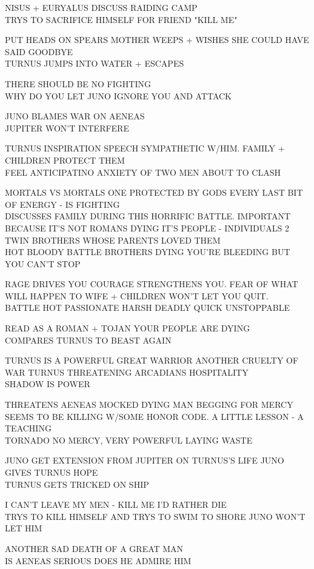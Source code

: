 \documentclass[10pt,letterpaper]{article}
\begin{document}
NISUS + EURYALUS DISCUSS RAIDING CAMP\\
TRYS TO SACRIFICE HIMSELF FOR FRIEND "KILL ME"

PUT HEADS ON SPEARS MOTHER WEEPS + WISHES SHE COULD HAVE SAID GOODBYE\\
TURNUS JUMPS INTO WATER + ESCAPES

THERE SHOULD BE NO FIGHTING\\
WHY DO YOU LET JUNO IGNORE YOU AND ATTACK

JUNO BLAMES WAR ON AENEAS\\
JUPITER WON'T INTERFERE

TURNUS INSPIRATION SPEECH SYMPATHETIC W/HIM. FAMILY + CHILDREN PROTECT THEM\\
FEEL ANTICIPATINO ANXIETY OF TWO MEN ABOUT TO CLASH

MORTALS VS MORTALS ONE PROTECTED BY GODS EVERY LAST BIT OF ENERGY {-} IS FIGHTING\\
DISCUSSES FAMILY DURING THIS HORRIFIC BATTLE.  IMPORTANT BECAUSE IT'S NOT ROMANS DYING IT'S PEOPLE {-} INDIVIDUALS 2 TWIN BROTHERS WHOSE PARENTS LOVED THEM\\
HOT BLOODY BATTLE BROTHERS DYING YOU'RE BLEEDING BUT YOU CAN'T STOP

RAGE DRIVES YOU COURAGE STRENGTHENS YOU. FEAR OF WHAT WILL HAPPEN TO WIFE + CHILDREN WON'T LET YOU QUIT.\\
BATTLE HOT PASSIONATE HARSH DEADLY QUICK UNSTOPPABLE

READ AS A ROMAN + TOJAN YOUR PEOPLE ARE DYING\\
COMPARES TURNUS TO BEAST AGAIN

TURNUS IS A POWERFUL GREAT WARRIOR ANOTHER CRUELTY OF WAR TURNUS THREATENING ARCADIANS HOSPITALITY\\
SHADOW IS POWER

THREATENS AENEAS MOCKED DYING MAN BEGGING FOR MERCY SEEMS TO BE KILLING W/SOME HONOR CODE. A LITTLE LESSON {-} A TEACHING\\
TORNADO NO MERCY, VERY POWERFUL LAYING WASTE

JUNO GET EXTENSION FROM JUPITER ON TURNUS'S LIFE JUNO GIVES TURNUS HOPE\\
TURNUS GETS TRICKED ON SHIP

I CAN'T LEAVE MY MEN {-} KILL ME I'D RATHER DIE\\
TRYS TO KILL HIMSELF AND TRYS TO SWIM TO SHORE JUNO WON'T LET HIM

ANOTHER SAD DEATH OF A GREAT MAN\\
IS AENEAS SERIOUS DOES HE ADMIRE HIM
\end{document}
